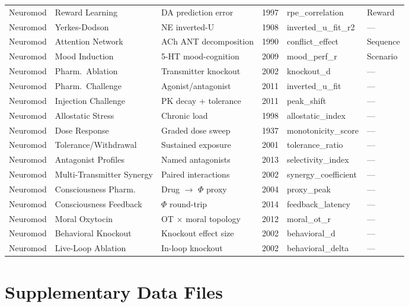 \documentclass[10pt,landscape]{article}
\begin{document}
\begin{longtable}{@{}p{2.3cm}p{3.0cm}p{4.5cm}p{0.6cm}p{3.8cm}p{1.8cm}@{}}
\midrule
Neuromod & Reward Learning & DA prediction error \citep{schultz1997dopamine} & 1997 & rpe\_correlation & Reward \\
Neuromod & Yerkes-Dodson & NE inverted-U \citep{yerkes1908relation} & 1908 & inverted\_u\_fit\_r2 & --- \\
Neuromod & Attention Network & ACh ANT decomposition & 1990 & conflict\_effect & Sequence \\
Neuromod & Mood Induction & 5-HT mood-cognition & 2009 & mood\_perf\_r & Scenario \\
Neuromod & Pharm.\ Ablation & Transmitter knockout & 2002 & knockout\_d & --- \\
Neuromod & Pharm.\ Challenge & Agonist/antagonist & 2011 & inverted\_u\_fit & --- \\
Neuromod & Injection Challenge & PK decay + tolerance & 2011 & peak\_shift & --- \\
Neuromod & Allostatic Stress & Chronic load & 1998 & allostatic\_index & --- \\
Neuromod & Dose Response & Graded dose sweep & 1937 & monotonicity\_score & --- \\
Neuromod & Tolerance/Withdrawal & Sustained exposure & 2001 & tolerance\_ratio & --- \\
Neuromod & Antagonist Profiles & Named antagonists & 2013 & selectivity\_index & --- \\
Neuromod & Multi-Transmitter Synergy & Paired interactions & 2002 & synergy\_coefficient & --- \\
Neuromod & Consciousness Pharm. & Drug $\to$ $\Phi$ proxy & 2004 & proxy\_peak & --- \\
Neuromod & Consciousness Feedback & $\Phi$ round-trip & 2014 & feedback\_latency & --- \\
Neuromod & Moral Oxytocin & OT $\times$ moral topology & 2012 & moral\_ot\_r & --- \\
Neuromod & Behavioral Knockout & Knockout effect size & 2002 & behavioral\_d & --- \\
Neuromod & Live-Loop Ablation & In-loop knockout & 2002 & behavioral\_delta & --- \\

\end{longtable}

\clearpage
\section*{Supplementary Data Files}
\end{document}
